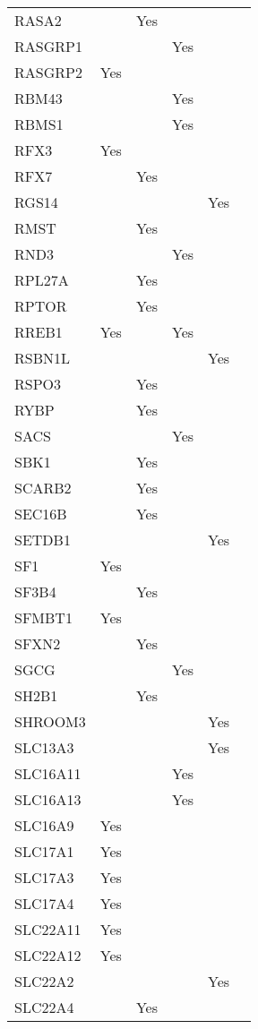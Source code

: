 \documentclass[]{report}
\begin{document}
\begin{longtable}[t]{llllll}
RASA2 &  & Yes &  &  & \\
RASGRP1 &  &  & Yes &  & \\
RASGRP2 & Yes &  &  &  & \\
RBM43 &  &  & Yes &  & \\
RBMS1 &  &  & Yes &  & \\
RFX3 & Yes &  &  &  & \\
RFX7 &  & Yes &  &  & \\
RGS14 &  &  &  & Yes & \\
RMST &  & Yes &  &  & \\
RND3 &  &  & Yes &  & \\
RPL27A &  & Yes &  &  & \\
RPTOR &  & Yes &  &  & \\
RREB1 & Yes &  & Yes &  & \\
RSBN1L &  &  &  & Yes & \\
RSPO3 &  & Yes &  &  & \\
RYBP &  & Yes &  &  & \\
SACS &  &  & Yes &  & \\
SBK1 &  & Yes &  &  & \\
SCARB2 &  & Yes &  &  & \\
SEC16B &  & Yes &  &  & \\
SETDB1 &  &  &  & Yes & \\
SF1 & Yes &  &  &  & \\
SF3B4 &  & Yes &  &  & \\
SFMBT1 & Yes &  &  &  & \\
SFXN2 &  & Yes &  &  & \\
SGCG &  &  & Yes &  & \\
SH2B1 &  & Yes &  &  & \\
SHROOM3 &  &  &  & Yes & \\
SLC13A3 &  &  &  & Yes & \\
SLC16A11 &  &  & Yes &  & \\
SLC16A13 &  &  & Yes &  & \\
SLC16A9 & Yes &  &  &  & \\
SLC17A1 & Yes &  &  &  & \\
SLC17A3 & Yes &  &  &  & \\
SLC17A4 & Yes &  &  &  & \\
SLC22A11 & Yes &  &  &  & \\
SLC22A12 & Yes &  &  &  & \\
SLC22A2 &  &  &  & Yes & \\
SLC22A4 &  & Yes &  &  & \\

\end{longtable}
\end{document}

